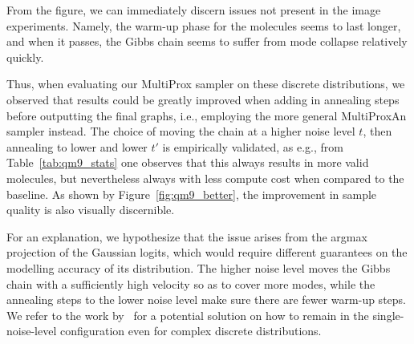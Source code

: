 From the figure, we can immediately discern issues not present in the image experiments. Namely, the warm-up phase for the molecules seems to last longer, and when it passes, the Gibbs chain seems to suffer from mode collapse relatively quickly.

Thus, when evaluating our MultiProx sampler on these discrete distributions, we observed that results could be greatly improved when adding in annealing steps before outputting the final graphs, i.e., employing the more general MultiProxAn sampler instead. The choice of moving the chain at a higher noise level $t$, then annealing to lower and lower $t'$ is empirically validated, as e.g., from Table~\ref{tab:qm9_stats} one observes that this always results in more valid molecules, but nevertheless always with less compute cost when compared to the baseline. As shown by Figure~\ref{fig:qm9_better}, the improvement in sample quality is also visually discernible. 

For an explanation, we hypothesize that the issue arises from the argmax projection of the Gaussian logits, which would require different guarantees on the modelling accuracy of its distribution. The higher noise level moves the Gibbs chain with a sufficiently high velocity so as to cover more modes, while the annealing steps to the lower noise level make sure there are fewer warm-up steps. We refer to the work by~\cite{sahoo_diffusion_2025} for a potential solution on how to remain in the single-noise-level configuration even for complex discrete distributions. 

